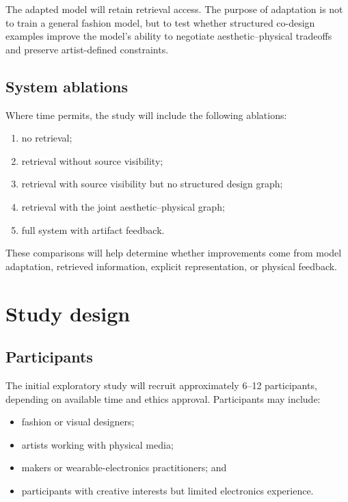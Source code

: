 \documentclass{article}
\begin{document}
The adapted model will retain retrieval access. The purpose of adaptation is not
to train a general fashion model, but to test whether structured co-design
examples improve the model's ability to negotiate aesthetic--physical tradeoffs
and preserve artist-defined constraints.

\subsection{System ablations}

Where time permits, the study will include the following ablations:

\begin{enumerate}[leftmargin=*]
    \item no retrieval;
    \item retrieval without source visibility;
    \item retrieval with source visibility but no structured design graph;
    \item retrieval with the joint aesthetic--physical graph;
    \item full system with artifact feedback.
\end{enumerate}

These comparisons will help determine whether improvements come from model
adaptation, retrieved information, explicit representation, or physical
feedback.

\section{Study design}

\subsection{Participants}

The initial exploratory study will recruit approximately 6--12 participants,
depending on available time and ethics approval. Participants may include:

\begin{itemize}[leftmargin=*]
    \item fashion or visual designers;
    \item artists working with physical media;
    \item makers or wearable-electronics practitioners; and
    \item participants with creative interests but limited electronics
    experience.
\end{itemize}
\end{document}

